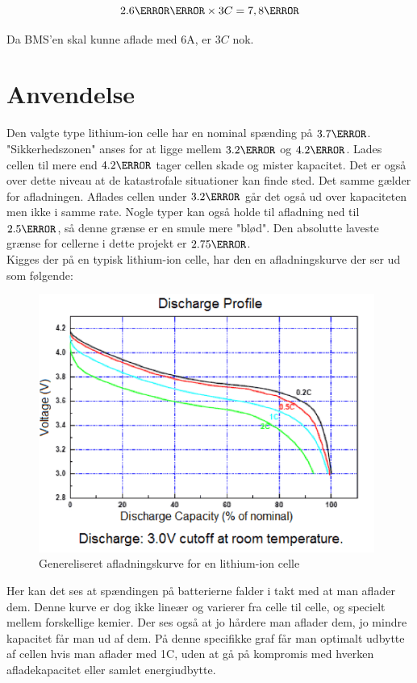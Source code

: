 \begin {equation}
2.6\ampere\hour \times 3C = 7,8\ampere
\end {equation}

Da BMS'en skal kunne aflade med 6A, er $3C$ nok.

\section{Anvendelse}
Den valgte type lithium-ion celle har en nominal spænding på $3.7\volt$. "Sikkerhedszonen" \space anses for at ligge mellem $3.2\volt$ og $4.2\volt$. Lades cellen til mere end $4.2\volt$ tager cellen skade og mister kapacitet. Det er også over dette niveau at de katastrofale situationer kan finde sted. Det samme gælder for afladningen. Aflades cellen under $3.2\volt$ går det også ud over kapaciteten men ikke i samme rate. Nogle typer kan også holde til afladning ned til $2.5\volt$, så denne grænse er en smule mere "blød". Den absolutte laveste grænse for cellerne i dette projekt er $2.75\volt$. \\

Kigges der på en typisk lithium-ion celle, har den en afladningskurve der ser ud som følgende: 

\begin{figure}[h]
\centering
\includegraphics[width=11cm]{billeder/discharge_curve.png}
\caption{Genereliseret afladningskurve for en lithium-ion celle}
\label{fig:discharge_curve}
\end{figure}

Her kan det ses at spændingen på batterierne falder i takt med at man aflader dem. Denne kurve er dog ikke lineær og varierer fra celle til celle, og specielt mellem forskellige kemier. Der ses også at jo hårdere man aflader dem, jo mindre kapacitet får man ud af dem. På denne specifikke graf får man optimalt udbytte af cellen hvis man aflader med 1C, uden at gå på kompromis med hverken afladekapacitet eller samlet energiudbytte. \\

